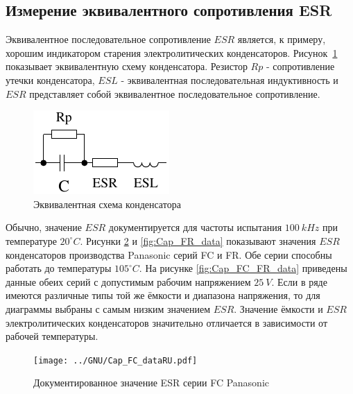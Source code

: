 \subsection{Измерение эквивалентного сопротивления ESR}
Эквивалентное последовательное сопротивление \(ESR\) \cite{ESR} является, к примеру, хорошим индикатором старения электролитических конденсаторов.
Рисунок~\ref{fig:Cap_equiv} показывает эквивалентную схему конденсатора.
Резистор \(Rp\) - сопротивление утечки конденсатора, \(ESL\) - эквивалентная последовательная индуктивность и
\(ESR\) представляет собой эквивалентное последовательное сопротивление.

\begin{figure}[H]
  \centering
    \includegraphics[width=.8\textwidth]{../FIG/Cap_equiv.pdf}
  \caption{Эквивалентная схема конденсатора}
  \label{fig:Cap_equiv}
\end{figure}

Обычно, значение \(ESR\) документируется для частоты испытания \(100~kHz\) при температуре 
\(20^{\circ} C\).
Рисунки \ref{fig:Cap_FC_data} и \ref{fig:Cap_FR_data} показывают значения \(ESR\) конденсаторов производства 
Panasonic серий FC и  FR.
Обе серии способны работать до температуры \(105^{\circ} C\).
На рисунке \ref{fig:Cap_FC_FR_data} приведены данные обеих серий с допустимым рабочим напряжением \(25~V\).
Если в ряде имеются различные типы той же ёмкости и диапазона напряжения, то для диаграммы выбраны 
с самым низким значением \(ESR\).
Значение ёмкости и \(ESR\) электролитических конденсаторов значительно отличается в зависимости от рабочей температуры. 

\begin{figure}[H]
  \centering
    \texttt{[image: ../GNU/Cap\_FC\_dataRU.pdf]}
  \caption{Документированное значение ESR серии FC Panasonic}
  \label{fig:Cap_FC_data}
\end{figure}

